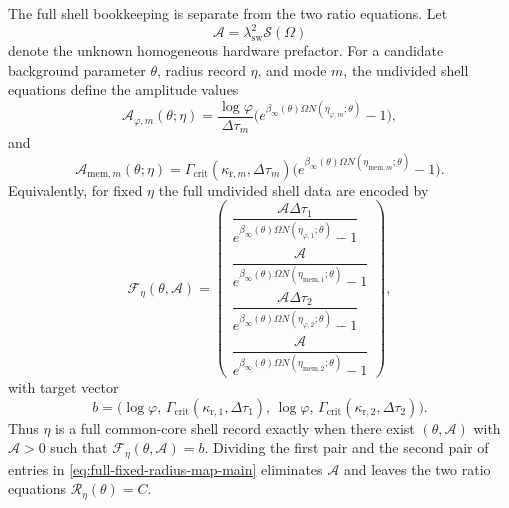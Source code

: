 The full shell bookkeeping is separate from the two ratio equations. Let
\[
\mathcal A=\lambda_{\mathrm{sw}}^2\mathcal S(\Omega)
\]
denote the unknown homogeneous hardware prefactor. For a candidate background
parameter $\theta$, radius record $\eta$, and mode $m$, the undivided shell
equations define the amplitude values
\[
\mathcal A_{\varphi,m}(\theta;\eta)=
\frac{\log\varphi}{\Delta\tau_m}
\bigl(e^{\beta_\infty(\theta)\Omega N(\eta_{\varphi,m};\theta)}-1\bigr),
\]
and
\[
\mathcal A_{{\mathrm{mem}},m}(\theta;\eta)=
\Gamma_{\mathrm{crit}}(\kappa_{{\mathrm r},m},\Delta\tau_m)
\bigl(e^{\beta_\infty(\theta)\Omega N(\eta_{{\mathrm{mem}},m};\theta)}-1\bigr).
\]
Equivalently, for fixed $\eta$ the full undivided shell data are encoded by
\begin{equation}\label{eq:full-fixed-radius-map-main}
\mathcal F_\eta(\theta,\mathcal A)=
\begin{pmatrix}
\dfrac{\mathcal A\Delta\tau_1}
      {e^{\beta_\infty(\theta)\Omega N(\eta_{\varphi,1};\theta)}-1} \\
\dfrac{\mathcal A}
      {e^{\beta_\infty(\theta)\Omega N(\eta_{{\mathrm{mem}},1};\theta)}-1} \\
\dfrac{\mathcal A\Delta\tau_2}
      {e^{\beta_\infty(\theta)\Omega N(\eta_{\varphi,2};\theta)}-1} \\
\dfrac{\mathcal A}
      {e^{\beta_\infty(\theta)\Omega N(\eta_{{\mathrm{mem}},2};\theta)}-1}
\end{pmatrix},
\end{equation}
with target vector
\begin{equation}\label{eq:full-fixed-radius-target-main}
b=
\bigl(
\log\varphi,\,
\Gamma_{\mathrm{crit}}(\kappa_{{\mathrm r},1},\Delta\tau_1),\,
\log\varphi,\,
\Gamma_{\mathrm{crit}}(\kappa_{{\mathrm r},2},\Delta\tau_2)
\bigr).
\end{equation}
Thus $\eta$ is a full common-core shell record exactly when there exist
$(\theta,\mathcal A)$ with $\mathcal A>0$ such that
$\mathcal F_\eta(\theta,\mathcal A)=b$. Dividing the first pair and the second
pair of entries in \eqref{eq:full-fixed-radius-map-main} eliminates
$\mathcal A$ and leaves the two ratio equations
$\mathcal R_\eta(\theta)=C$.

